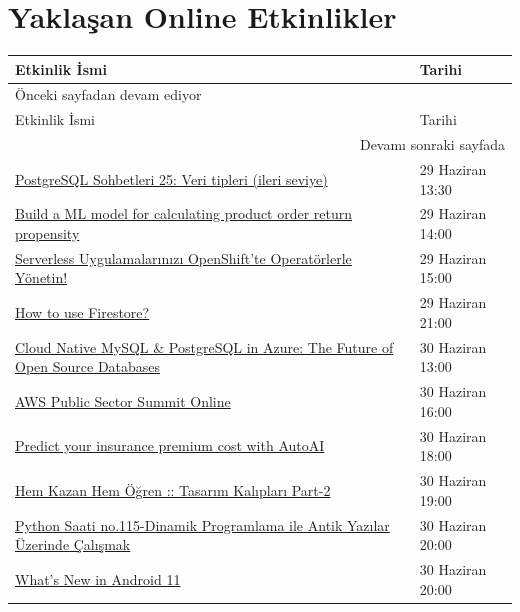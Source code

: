 \documentclass[11pt]{article}
\begin{document}
\section{Yaklaşan Online Etkinlikler}
\label{sec:orgbe1f3b6}
\begin{longtable}{|p{9.5cm}|l|}
\hline
Etkinlik İsmi & Tarihi\\
\hline
\endfirsthead
\multicolumn{2}{l}{Önceki sayfadan devam ediyor} \\
\hline

Etkinlik İsmi & Tarihi \\

\hline
\endhead
\hline\multicolumn{2}{r}{Devamı sonraki sayfada} \\
\endfoot
\endlastfoot
\hline
\href{https://kommunity.com/pgtr/events/postgresql-sohbetleri-25-veri-tipleri-ileri-seviye-b80d6bfc}{PostgreSQL Sohbetleri 25: Veri tipleri (ileri seviye)} & 29 Haziran 13:30\\
\href{https://www.meetup.com/tr-TR/IBMDeveloperTR/events/270949858/}{Build a ML model for calculating product order return propensity} & 29 Haziran 14:00\\
\href{https://www.meetup.com/tr-TR/IBMDeveloperTR/events/270785212/}{Serverless Uygulamalarınızı OpenShift'te Operatörlerle Yönetin!} & 29 Haziran 15:00\\
\href{https://www.meetup.com/tr-TR/FirebaseTR/events/270991062/}{How to use Firestore?} & 29 Haziran 21:00\\
\href{https://www.meetup.com/tr-TR/Microsoft-Giri\%25C5\%259Fimcilik-Bulu\%25C5\%259Fmalar\%25C4\%25B1/events/271443638/}{Cloud Native MySQL \& PostgreSQL in Azure: The Future of Open Source Databases} & 30 Haziran 13:00\\
\href{https://www.meetup.com/tr-TR/Cloud-Computing-Technologists/events/270604890/}{AWS Public Sector Summit Online} & 30 Haziran 16:00\\
\href{https://www.meetup.com/tr-TR/IBMDeveloperTR/events/270949795/}{Predict your insurance premium cost with AutoAI} & 30 Haziran 18:00\\
\href{https://www.meetup.com/tr-TR/Istanbul-Java-User-Group/events/271377159/}{Hem Kazan Hem Öğren :: Tasarım Kalıpları Part-2} & 30 Haziran 19:00\\
\href{https://www.meetup.com/tr-TR/python-istanbul/events/271526409/}{Python Saati no.115-Dinamik Programlama ile Antik Yazılar Üzerinde Çalışmak} & 30 Haziran 20:00\\
\href{https://www.meetup.com/tr-TR/GDG-Hatay/events/270946487/}{What's New in Android 11} & 30 Haziran 20:00\\

\end{longtable}
\end{document}
